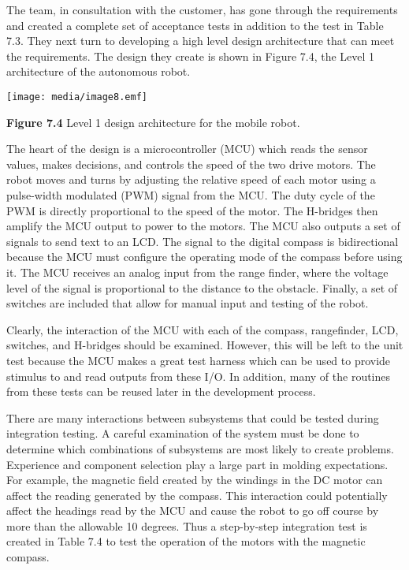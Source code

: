 The team, in consultation with the customer, has gone through the
requirements and created a complete set of acceptance tests in addition
to the test in Table 7.3. They next turn to developing a high level
design architecture that can meet the requirements. The design they
create is shown in Figure 7.4, the Level 1 architecture of the
autonomous robot.

\texttt{[image: media/image8.emf]}

\textbf{Figure 7.4} Level 1 design architecture for the mobile robot.

The heart of the design is a microcontroller (MCU) which reads the
sensor values, makes decisions, and controls the speed of the two drive
motors. The robot moves and turns by adjusting the relative speed of
each motor using a pulse-width modulated (PWM) signal from the MCU. The
duty cycle of the PWM is directly proportional to the speed of the
motor. The H-bridges then amplify the MCU output to power to the motors.
The MCU also outputs a set of signals to send text to an LCD. The signal
to the digital compass is bidirectional because the MCU must configure
the operating mode of the compass before using it. The MCU receives an
analog input from the range finder, where the voltage level of the
signal is proportional to the distance to the obstacle. Finally, a set
of switches are included that allow for manual input and testing of the
robot.

Clearly, the interaction of the MCU with each of the compass,
rangefinder, LCD, switches, and H-bridges should be examined. However,
this will be left to the unit test because the MCU makes a great test
harness which can be used to provide stimulus to and read outputs from
these I/O. In addition, many of the routines from these tests can be
reused later in the development process.

There are many interactions between subsystems that could be tested
during integration testing. A careful examination of the system must be
done to determine which combinations of subsystems are most likely to
create problems. Experience and component selection play a large part in
molding expectations. For example, the magnetic field created by the
windings in the DC motor can affect the reading generated by the
compass. This interaction could potentially affect the headings read by
the MCU and cause the robot to go off course by more than the allowable
10 degrees. Thus a step-by-step integration test is created in Table 7.4
to test the operation of the motors with the magnetic compass.

